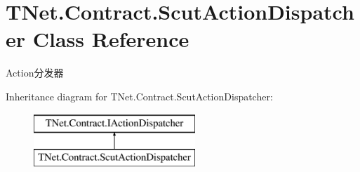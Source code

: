 \hypertarget{class_t_net_1_1_contract_1_1_scut_action_dispatcher}{}\section{T\+Net.\+Contract.\+Scut\+Action\+Dispatcher Class Reference}
\label{class_t_net_1_1_contract_1_1_scut_action_dispatcher}


Action分发器  


Inheritance diagram for T\+Net.\+Contract.\+Scut\+Action\+Dispatcher\+:\begin{figure}[H]
\begin{center}
\leavevmode
\includegraphics[height=2.000000cm]{class_t_net_1_1_contract_1_1_scut_action_dispatcher}
\end{center}
\end{figure}
